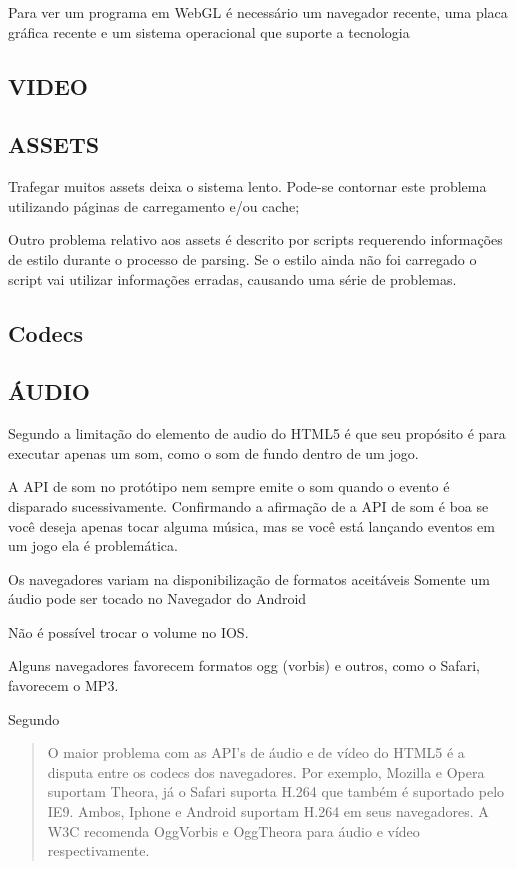 \begin{draft}
Para ver um programa em WebGL é necessário um navegador recente, uma placa gráfica recente e um sistema operacional que suporte a tecnologia \autocite{html5mostwanted}

\subsection{VIDEO}

\subsection{ASSETS}

Trafegar muitos assets deixa o sistema lento.  Pode-se contornar este problema utilizando páginas de carregamento e/ou cache;

Outro problema relativo aos assets é descrito por \cite{howBrowsersWork}
scripts requerendo informações de estilo durante o processo de 
parsing. Se o estilo ainda não foi carregado o script vai utilizar 
informações erradas, causando uma série de problemas.

\subsection{Codecs}

\subsection{ÁUDIO}

Segundo \cite{html5mostwanted} a limitação do elemento de audio do HTML5 é que seu propósito é para executar apenas um som, como o som de fundo dentro de um jogo.

A API de som no protótipo nem sempre emite o som quando o evento é disparado
sucessivamente. Confirmando a afirmação de \cite{html5mostwanted} a API de som é boa se você deseja apenas tocar alguma música, mas se você está lançando eventos em um jogo ela é problemática.

Os navegadores variam na disponibilização de formatos aceitáveis
Somente um áudio pode ser tocado no Navegador do Android

Não é possível trocar o volume no IOS.

Alguns navegadores favorecem formatos ogg (vorbis) e outros, como o
Safari, favorecem o MP3.

Segundo \cite{html5Tradeoffs}
\begin{quote}
O maior problema com as API's de áudio e de vídeo do HTML5 é
a disputa entre os codecs dos navegadores. Por exemplo, Mozilla e
Opera suportam Theora, já o Safari suporta H.264 que também é
suportado pelo IE9. Ambos, Iphone e Android suportam H.264 em seus
navegadores. A W3C recomenda OggVorbis e OggTheora para áudio e vídeo
respectivamente.
\end{quote}


\end{draft}

